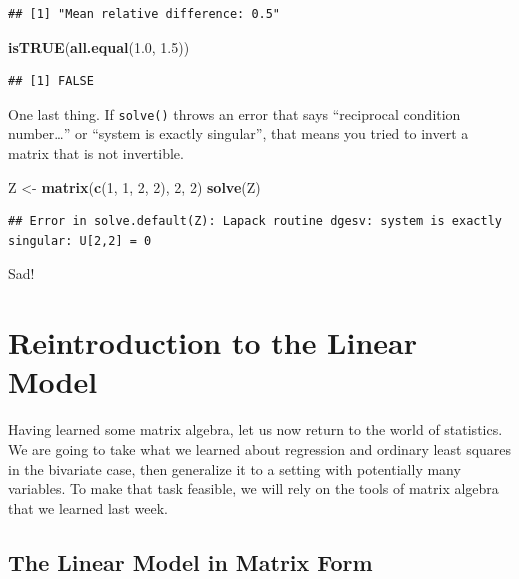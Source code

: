 \documentclass[12pt,oneside,openany]{book}
\newenvironment{Shaded}{\begin{snugshade}}{\end{snugshade}}
\newcommand{\KeywordTok}[1]{\textcolor[rgb]{0.13,0.29,0.53}{\textbf{#1}}}
\newcommand{\DecValTok}[1]{\textcolor[rgb]{0.00,0.00,0.81}{#1}}
\newcommand{\FloatTok}[1]{\textcolor[rgb]{0.00,0.00,0.81}{#1}}
\newcommand{\StringTok}[1]{\textcolor[rgb]{0.31,0.60,0.02}{#1}}
\newcommand{\NormalTok}[1]{#1}
\begin{document}
\begin{verbatim}
## [1] "Mean relative difference: 0.5"
\end{verbatim}

\begin{Shaded}
\begin{Highlighting}[]
\KeywordTok{isTRUE}\NormalTok{(}\KeywordTok{all.equal}\NormalTok{(}\FloatTok{1.0}\NormalTok{, }\FloatTok{1.5}\NormalTok{))}
\end{Highlighting}
\end{Shaded}

\begin{verbatim}
## [1] FALSE
\end{verbatim}

One last thing. If \texttt{solve()} throws an error that says
``reciprocal condition number\ldots{}'' or ``system is exactly
singular'', that means you tried to invert a matrix that is not
invertible.

\begin{Shaded}
\begin{Highlighting}[]
\NormalTok{Z <-}\StringTok{ }\KeywordTok{matrix}\NormalTok{(}\KeywordTok{c}\NormalTok{(}\DecValTok{1}\NormalTok{, }\DecValTok{1}\NormalTok{, }\DecValTok{2}\NormalTok{, }\DecValTok{2}\NormalTok{), }\DecValTok{2}\NormalTok{, }\DecValTok{2}\NormalTok{)}
\KeywordTok{solve}\NormalTok{(Z)}
\end{Highlighting}
\end{Shaded}

\begin{verbatim}
## Error in solve.default(Z): Lapack routine dgesv: system is exactly singular: U[2,2] = 0
\end{verbatim}

Sad!

\chapter{Reintroduction to the Linear Model}\label{ols-matrix}

\newcommand{\OLS}{\text{OLS}}

Having learned some matrix algebra, let us now return to the world of
statistics. We are going to take what we learned about regression and
ordinary least squares in the bivariate case, then generalize it to a
setting with potentially many variables. To make that task feasible, we
will rely on the tools of matrix algebra that we learned last week.

\section{The Linear Model in Matrix
Form}\label{the-linear-model-in-matrix-form}
\end{document}
